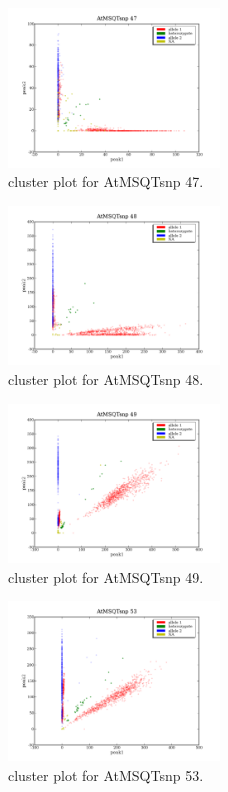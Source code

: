 \begin{figure}[H]
\includegraphics[width=0.5\textwidth]{figures/cluster_plot_AtMSQTsnp_47.png}
\caption{cluster plot for AtMSQTsnp 47.} \label{flAtMSQTsnp47}
\end{figure}

\begin{figure}[H]
\includegraphics[width=0.5\textwidth]{figures/cluster_plot_AtMSQTsnp_48.png}
\caption{cluster plot for AtMSQTsnp 48.} \label{flAtMSQTsnp48}
\end{figure}

\begin{figure}[H]
\includegraphics[width=0.5\textwidth]{figures/cluster_plot_AtMSQTsnp_49.png}
\caption{cluster plot for AtMSQTsnp 49.} \label{flAtMSQTsnp49}
\end{figure}

\begin{figure}[H]
\includegraphics[width=0.5\textwidth]{figures/cluster_plot_AtMSQTsnp_53.png}
\caption{cluster plot for AtMSQTsnp 53.} \label{flAtMSQTsnp53}
\end{figure}

